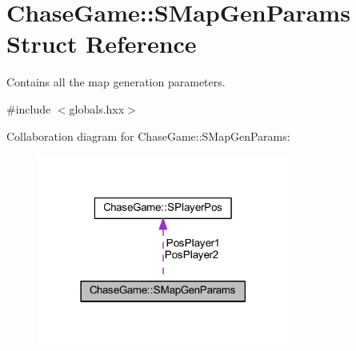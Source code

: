\hypertarget{struct_chase_game_1_1_s_map_gen_params}{\section{Chase\-Game\-:\-:S\-Map\-Gen\-Params Struct Reference}
\label{struct_chase_game_1_1_s_map_gen_params}
}


Contains all the map generation parameters.  




{\ttfamily \#include $<$globals.\-hxx$>$}



Collaboration diagram for Chase\-Game\-:\-:S\-Map\-Gen\-Params\-:\nopagebreak
\begin{figure}[H]
\begin{center}
\leavevmode
\includegraphics[width=234pt]{struct_chase_game_1_1_s_map_gen_params__coll__graph}
\end{center}
\end{figure}
